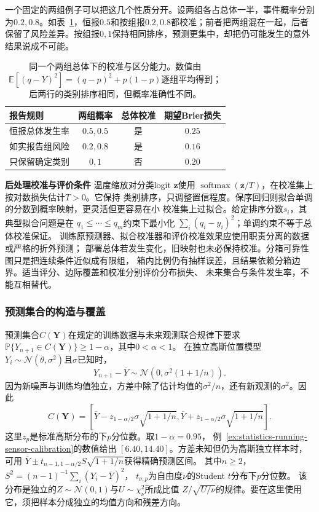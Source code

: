 一个固定的两组例子可以把这几个性质分开。设两组各占总体一半，事件概率分别为\(0.2,0.8\)。如表~\ref{tab:statistics-calibration-discrimination}，恒报\(0.5\)和按组报\(0.2,0.8\)都校准；前者把两组混在一起，后者保留了风险差异。按组报\(0,1\)保持相同排序，预测更集中，却把仍可能发生的意外结果说成不可能。
\begin{table}[htbp]
  \centering
  \small
  \begin{tabular}{lccc}
    \toprule
    报告规则 & 两组概率 & 总体校准 & 期望Brier损失 \\
    \midrule
    恒报总体发生率 & \(0.5,0.5\) & 是 & \(0.25\) \\
    如实报告组风险 & \(0.2,0.8\) & 是 & \(0.16\) \\
    只保留确定类别 & \(0,1\) & 否 & \(0.20\) \\
    \bottomrule
  \end{tabular}
  \caption{同一个两组总体下的校准与区分能力。数值由\(\mathbb E[(q-Y)^2]=(q-p)^2+p(1-p)\)逐组平均得到；后两行的类别排序相同，但概率准确性不同。}
  \label{tab:statistics-calibration-discrimination}
\end{table}

\par\medskip\noindent\textbf{后处理校准与评价条件}\quad
温度缩放对分类logit \(\bm z\)使用
\(\operatorname{softmax}(\bm z/T)\)，在校准集上按对数损失估计\(T>0\)。它保持
类别排序，只调整置信程度。保序回归则拟合单调的分数到概率映射，更灵活但更容易在小
校准集上过拟合。给定排序分数\(s_i\)，其典型拟合问题是在
\(q_1\leq\cdots\leq q_m\)约束下最小化
\(\sum_i(q_i-y_i)^2\)；单调约束不等于总体校准保证。
训练原预测器、拟合校准器和评价校准效果应使用职责分离的数据或严格的折外预测；
部署总体若发生变化，旧映射也未必保持校准。分箱可靠性图只是把连续条件近似成有限组，
箱内比例仍有抽样误差，且结果依赖分箱边界。适当评分、边际覆盖和校准分别评价分布损失、
未来集合与条件发生率，不能互相替代。

\subsubsection{预测集合的构造与覆盖}
\label{sec:probability-exchangeability-conformal-ranks}
\label{sec:rv-prediction-sets}
预测集合\(C(\bm Y)\)在规定的训练数据与未来观测联合规律下要求
\(\mathbb P\{Y_{n+1}\in C(\bm Y)\}\geq1-\alpha\)，其中\(0<\alpha<1\)。
在独立高斯位置模型\(Y_i\sim\mathcal N(\theta,\sigma^2)\)且\(\sigma\)已知时，
\[
Y_{n+1}-\overline Y\sim\mathcal N(0,\sigma^2(1+1/n)).
\]
因为新噪声与训练均值独立，方差中除了估计均值的\(\sigma^2/n\)，还有新观测的\(\sigma^2\)。因此
\[
C(\bm Y)=\left[\overline Y-z_{1-\alpha/2}\sigma\sqrt{1+1/n},
\overline Y+z_{1-\alpha/2}\sigma\sqrt{1+1/n}\right].
\]
这里\(z_p\)是标准高斯分布的下\(p\)分位数。取\(1-\alpha=0.95\)，
例~\ref{ex:statistics-running-sensor-calibration}的数值给出
\([6.40,14.40]\)。方差未知但仍为高斯独立样本时，可用
\(\overline Y\pm t_{n-1,1-\alpha/2}S\sqrt{1+1/n}\)获得精确预测区间。
其中\(n\geq2\)，\(S^2=(n-1)^{-1}\sum_i(Y_i-\overline Y)^2\)，
\(t_{\nu,p}\)为自由度\(\nu\)的Student \(t\)分布下\(p\)分位数。
该分布是独立的\(Z\sim\mathcal N(0,1)\)与\(U\sim\chi_\nu^2\)所成比值
\(Z/\sqrt{U/\nu}\)的规律。要在这里使用它，须把样本分成独立的均值方向和残差方向。

